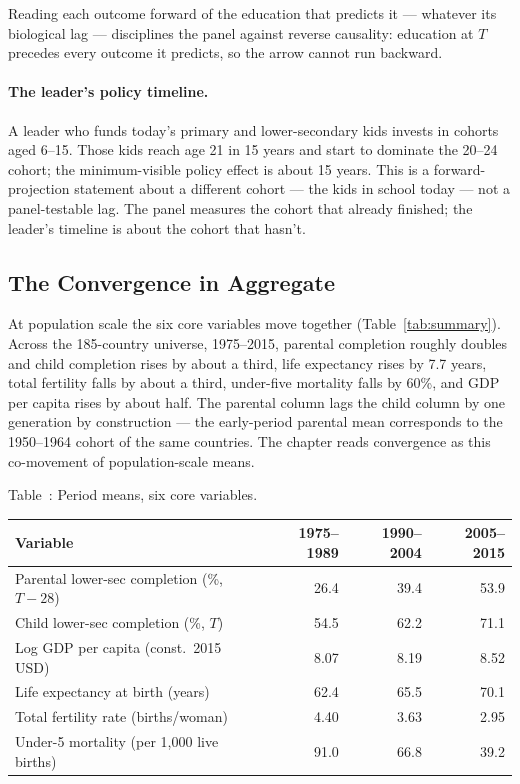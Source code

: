 \documentclass[12pt,letterpaper]{article}
\begin{document}
Reading each outcome forward of the education that predicts it ---
whatever its biological lag --- disciplines the panel against
reverse causality: education at $T$ precedes every outcome it
predicts, so the arrow cannot run backward.

\paragraph{The leader's policy timeline.} A leader who funds today's
primary and lower-secondary kids invests in cohorts aged 6--15.
Those kids reach age 21 in 15 years and start to dominate the
20--24 cohort; the minimum-visible policy effect is about 15
years. This is a forward-projection statement about a different
cohort --- the kids in school today --- not a panel-testable lag.
The panel measures the cohort that already finished; the leader's
timeline is about the cohort that hasn't.

\subsection{The Convergence in Aggregate}\label{convergence-in-aggregate}

At population scale the six core variables move together
(Table~\ref{tab:summary}). Across the 185-country universe,
1975--2015, parental completion roughly doubles and child
completion rises by about a third, life expectancy rises by 7.7
years, total fertility falls by about a third, under-five mortality
falls by 60\%, and GDP per capita rises by about half. The parental column lags the child column by one
generation by construction --- the early-period parental mean
corresponds to the 1950--1964 cohort of the same countries. The
chapter reads convergence as this co-movement of population-scale
means.

\label{tab:summary}Table~\thetable: Period means, six core variables.

{\small
\begin{longtable}[]{@{}lrrr@{}}
\toprule
Variable & 1975--1989 & 1990--2004 & 2005--2015 \\
\midrule
\endhead
Parental lower-sec completion (\%, $T{-}28$) & 26.4 & 39.4 & 53.9 \\
Child lower-sec completion (\%, $T$)          & 54.5 & 62.2 & 71.1 \\
Log GDP per capita (const.\ 2015 USD)         &  8.07 &  8.19 &  8.52 \\
Life expectancy at birth (years)              & 62.4 & 65.5 & 70.1 \\
Total fertility rate (births/woman)           &  4.40 &  3.63 &  2.95 \\
Under-5 mortality (per 1{,}000 live births)   & 91.0 & 66.8 & 39.2 \\
\bottomrule
\end{longtable}\addtocounter{table}{-1}%
}
\end{document}
